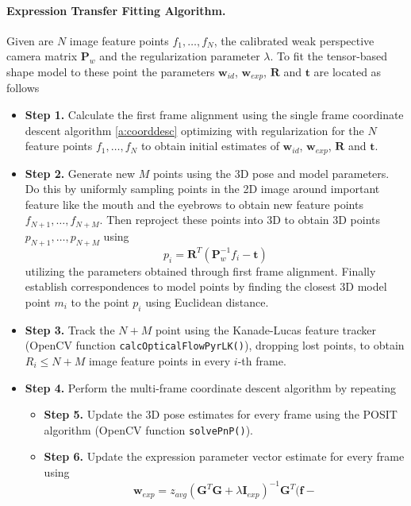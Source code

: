 \documentclass[11pt,a4paper]{report}
\begin{document}
\paragraph{Expression Transfer Fitting Algorithm. } \label{s:fit}Given are $N$ image feature points $f_1, \ldots ,f_N$, the
calibrated weak perspective camera matrix $\mathbf{P}_w$ and the regularization
parameter $\lambda$. To fit the
tensor-based shape model to these point the parameters $\mathbf{w}_{id}$,
$\mathbf{w}_{exp}$, $\mathbf{R}$ and $\mathbf{t}$ are located as follows
\begin{itemize}
\item \textbf{Step 1.} Calculate the first frame alignment using the single
  frame coordinate descent algorithm \ref{a:coorddesc} optimizing with
  regularization for the $N$ feature
  points $f_1, \ldots ,f_N$ to obtain initial estimates of $\mathbf{w}_{id}$,
$\mathbf{w}_{exp}$, $\mathbf{R}$ and $\mathbf{t}$.
\item \textbf{Step 2.} Generate new $M$ points using the 3D pose and model
  parameters. Do this by uniformly sampling points in the 2D image around important
  feature like the mouth and the eyebrows to obtain new feature points $f_{N+1},
  \ldots, f_{N+M}$. Then reproject these points into 3D to obtain 3D points $p_{N+1},
  \ldots, p_{N+M}$ using 
\begin{equation*}
p_i = \mathbf{R}^T(\mathbf{P}_w^{-1}f_i - \mathbf{t})
\end{equation*}
utilizing the parameters obtained through first frame alignment. Finally
establish correspondences to model points by finding the closest 3D model point
$m_i$ to the point $p_i$ using Euclidean distance.
\item \textbf{Step 3.} Track the $N+M$ point using the Kanade-Lucas feature
  tracker (OpenCV function \texttt{calcOpticalFlowPyrLK()}), dropping lost points, to obtain $R_i \le N+M$ image feature
  points in every $i$-th frame.
\item \textbf{Step 4.} Perform the multi-frame coordinate descent algorithm by repeating
\begin{itemize}
\item[\textbullet] \textbf{Step 5.} Update the 3D pose estimates for every frame
  using the POSIT algorithm (OpenCV function \texttt{solvePnP()}).
\item[\textbullet] \textbf{Step 6.} Update the expression parameter vector
  estimate for every frame using 
\begin{equation*}
\mathbf{w}_{exp} =z_{avg}(\mathbf{G}^T\mathbf{G} + \lambda\mathbf{I}_{exp})^{-1}\mathbf{G}^T\bigl(\mathbf{f} -

\end{equation*}
\end{itemize}
\end{itemize}
\end{document}
